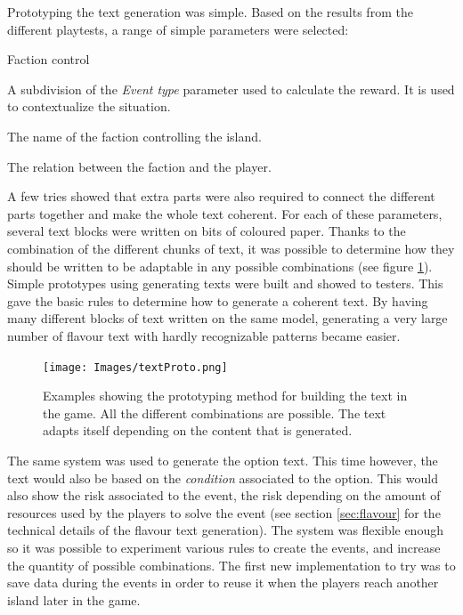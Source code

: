 Prototyping the text generation was simple. Based on the results from the different playtests, a range of simple parameters were selected:
\begin{labeling}{Faction control}
\item [\textbf{Location Type}] A subdivision of the \textit{Event type} parameter used to calculate the reward. It is used to contextualize the situation.
\item [\textbf{Faction control}] The name of the faction controlling the island.
\item [\textbf{Allegiance}] The relation between the faction and the player.
\end{labeling}

A few tries showed that extra parts were also required to connect the different parts together and make the whole text coherent. For each of these parameters, several text blocks were written on bits of coloured paper. Thanks to the combination of the different chunks of text, it was possible to determine how they should be written to be adaptable in any possible combinations (see figure \ref{fig:textproto}). Simple prototypes using generating texts were built and showed to testers. This gave the basic rules to determine how to generate a coherent text. By having many different blocks of text written on the same model, generating a very large number of flavour text with hardly recognizable patterns became easier. 
\begin{figure}[h]
    \centering
    \texttt{[image: Images/textProto.png]}
    \caption{Examples showing the prototyping method for building the text in the game. All the different combinations are possible. The text adapts itself depending on the content that is generated.}
    \label{fig:textproto}
\end{figure}

The same system was used to generate the option text. This time however, the text would also be based on the \textit{condition} associated to the option. This would also show the risk associated to the event, the risk depending on the amount of resources used by the players to solve the event (see section \ref{sec:flavour} for the technical details of the flavour text generation). The system was flexible enough so it was possible to experiment various rules to create the events, and increase the quantity of possible combinations. The first new implementation to try was to save data during the events in order to reuse it when the players reach another island later in the game.

